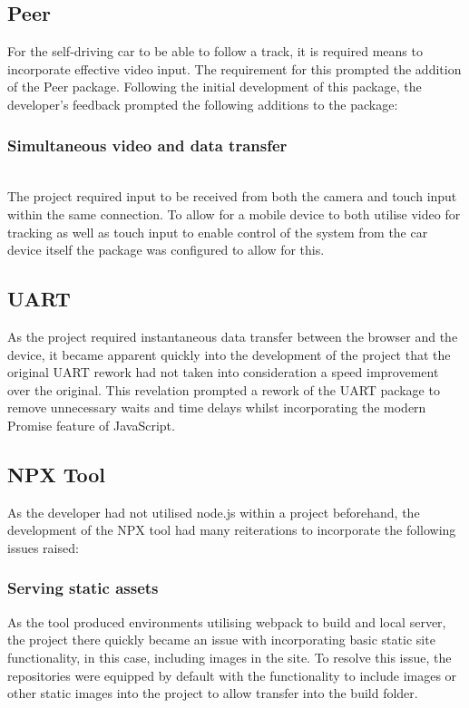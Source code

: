 \documentclass{l4proj}
\begin{document}
\subsection{Peer}
For the self-driving car to be able to follow a track, it is required means to incorporate effective video input. The requirement for this prompted the addition of the Peer package. Following the initial development of this package, the developer's feedback prompted the following additions to the package:

\subsubsection{Simultaneous video and data transfer}\hfill\\
The project required input to be received from both the camera and touch input within the same connection. To allow for a mobile device to both utilise video for tracking as well as touch input to enable control of the system from the car device itself the package was configured to allow for this.
\subsection{UART}
As the project required instantaneous data transfer between the browser and the device, it became apparent quickly into the development of the project that the original UART rework had not taken into consideration a speed improvement over the original. This revelation prompted a rework of the UART package to remove unnecessary waits and time delays whilst incorporating the modern Promise feature of JavaScript.

\subsection{NPX Tool}
As the developer had not utilised node.js within a project beforehand, the development of the NPX tool had many reiterations to incorporate the following issues raised:
\subsubsection{Serving static assets}
As the tool produced environments utilising webpack to build and local server, the project there quickly became an issue with incorporating basic static site functionality, in this case, including images in the site. To resolve this issue, the repositories were equipped by default with the functionality to include images or other static images into the project to allow transfer into the build folder.
\end{document}
